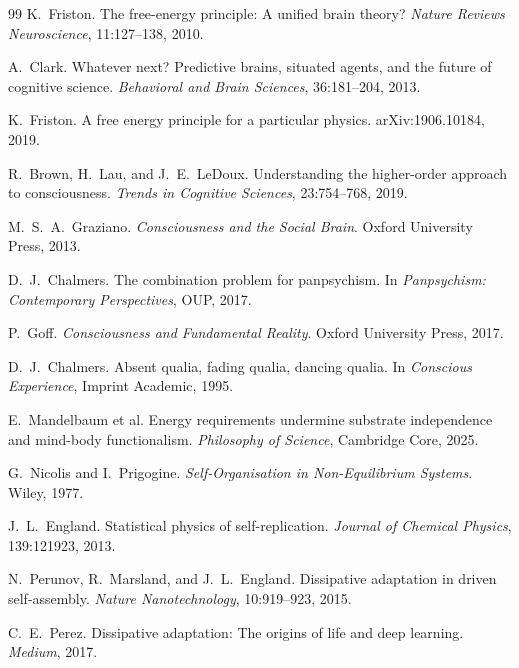 \documentclass[11pt]{article}
\begin{document}
\begin{thebibliography}{99}
K.~Friston.
\newblock The free-energy principle: A unified brain theory?
\newblock \emph{Nature Reviews Neuroscience}, 11:127--138, 2010.

A.~Clark.
\newblock Whatever next? Predictive brains, situated agents, and the
future of cognitive science.
\newblock \emph{Behavioral and Brain Sciences}, 36:181--204, 2013.

K.~Friston.
\newblock A free energy principle for a particular physics.
\newblock arXiv:1906.10184, 2019.

R.~Brown, H.~Lau, and J.~E.~LeDoux.
\newblock Understanding the higher-order approach to consciousness.
\newblock \emph{Trends in Cognitive Sciences}, 23:754--768, 2019.

M.~S.~A.~Graziano.
\newblock \emph{Consciousness and the Social Brain}.
\newblock Oxford University Press, 2013.

D.~J.~Chalmers.
\newblock The combination problem for panpsychism.
\newblock In \emph{Panpsychism: Contemporary Perspectives}, OUP, 2017.

P.~Goff.
\newblock \emph{Consciousness and Fundamental Reality}.
\newblock Oxford University Press, 2017.

D.~J.~Chalmers.
\newblock Absent qualia, fading qualia, dancing qualia.
\newblock In \emph{Conscious Experience}, Imprint Academic, 1995.

E.~Mandelbaum et al.
\newblock Energy requirements undermine substrate independence and
mind-body functionalism.
\newblock \emph{Philosophy of Science}, Cambridge Core, 2025.

G.~Nicolis and I.~Prigogine.
\newblock \emph{Self-Organisation in Non-Equilibrium Systems}.
\newblock Wiley, 1977.

J.~L.~England.
\newblock Statistical physics of self-replication.
\newblock \emph{Journal of Chemical Physics}, 139:121923, 2013.

N.~Perunov, R.~Marsland, and J.~L.~England.
\newblock Dissipative adaptation in driven self-assembly.
\newblock \emph{Nature Nanotechnology}, 10:919--923, 2015.

C.~E.~Perez.
\newblock Dissipative adaptation: The origins of life and deep
learning.
\newblock \emph{Medium}, 2017.


\end{thebibliography}
\end{document}
